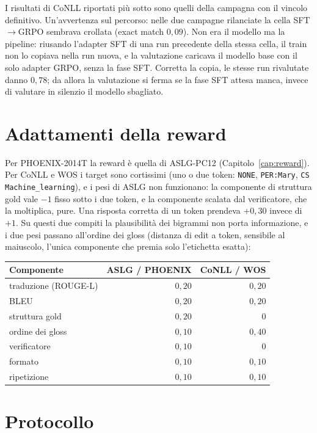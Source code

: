 I risultati di CoNLL riportati più sotto sono quelli della campagna con il
vincolo definitivo. Un'avvertenza sul percorso: nelle due campagne rilanciate
la cella SFT$\to$GRPO sembrava crollata (exact match $0{,}09$). Non era il
modello ma la pipeline: riusando l'adapter SFT di una run precedente della
stessa cella, il train non lo copiava nella run nuova, e la valutazione
caricava il modello base con il solo adapter GRPO, senza la fase SFT. Corretta
la copia, le stesse run rivalutate danno $0{,}78$; da allora la valutazione si
ferma se la fase SFT attesa manca, invece di valutare in silenzio il modello
sbagliato.

\section{Adattamenti della reward}

Per PHOENIX-2014T la reward è quella di ASLG-PC12 (Capitolo~\ref{cap:reward}).
Per CoNLL e WOS i target sono cortissimi (uno o due token: \texttt{NONE},
\texttt{PER:Mary}, \texttt{CS Machine\_learning}), e i pesi di ASLG non
funzionano: la componente di struttura gold vale $-1$ fisso sotto i due token, e
la componente scalata dal verificatore, che la moltiplica, pure. Una risposta
corretta di un token prendeva $+0{,}30$ invece di $+1$. Su questi due compiti
la plausibilità dei bigrammi non porta informazione, e i due pesi passano
all'ordine dei gloss (distanza di edit a token, sensibile al maiuscolo, l'unica
componente che premia solo l'etichetta esatta):

\begin{center}
\small
\begin{tabular}{lrr}
\toprule
Componente & ASLG / PHOENIX & CoNLL / WOS \\
\midrule
traduzione (ROUGE-L) & $0{,}20$ & $0{,}20$ \\
BLEU                 & $0{,}20$ & $0{,}20$ \\
struttura gold       & $0{,}20$ & $0$ \\
ordine dei gloss     & $0{,}10$ & $0{,}40$ \\
verificatore         & $0{,}10$ & $0$ \\
formato              & $0{,}10$ & $0{,}10$ \\
ripetizione          & $0{,}10$ & $0{,}10$ \\
\bottomrule
\end{tabular}
\end{center}

\section{Protocollo}

